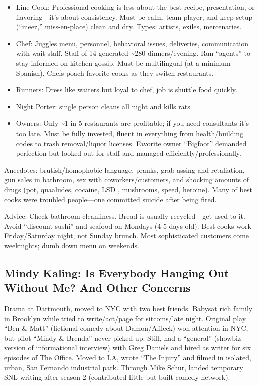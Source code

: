 \documentclass[
]{article}
\begin{document}
\begin{itemize}
\item
  Line Cook: Professional cooking is less about the best recipe,
  presentation, or flavoring---it's about consistency. Must be calm,
  team player, and keep setup (``meez,'' miss-en-place) clean and dry.
  Types: artists, exiles, mercenaries.
\item
  Chef: Juggles menu, personnel, behavioral issues, deliveries,
  communication with wait staff. Staff of 14 generated
  \textasciitilde280 dinners/evening. Run ``agents'' to stay informed on
  kitchen gossip. Must be multilingual (at a minimum Spanish). Chefs
  poach favorite cooks as they switch restaurants.
\item
  Runners: Dress like waiters but loyal to chef, job is shuttle food
  quickly.
\item
  Night Porter: single person cleans all night and kills rats.
\item
  Owners: Only \textasciitilde1 in 5 restaurants are profitable; if you
  need consultants it's too late. Must be fully invested, fluent in
  everything from health/building codes to trash removal/liquor
  licenses. Favorite owner ``Bigfoot'' demanded perfection but looked
  out for staff and managed efficiently/professionally.
\end{itemize}

Anecdotes: brutish/homophobic language, pranks, grab-assing and
retaliation, gun sales in bathroom, sex with coworkers/customers, and
shocking amounts of drugs (pot, quaaludes, cocaine, LSD , mushrooms,
speed, heroine). Many of best cooks were troubled people---one committed
suicide after being fired.

Advice: Check bathroom cleanliness. Bread is usually recycled---get used
to it. Avoid ``discount sushi'' and seafood on Mondays (4-5 days old).
Best cooks work Friday/Saturday night, not Sunday brunch. Most
sophisticated customers come weeknights; dumb down menu on weekends.

\hypertarget{mindy-kaling-is-everybody-hanging-out-without-me-and-other-concerns}{%
\subsection{Mindy Kaling: Is Everybody Hanging Out Without Me? And Other
Concerns}\label{mindy-kaling-is-everybody-hanging-out-without-me-and-other-concerns}}

Drama at Dartmouth, moved to NYC with two best friends. Babysat rich
family in Brooklyn while tried to write/act/page for sitcoms/late night.
Original play ``Ben \& Matt'' (fictional comedy about Damon/Affleck) won
attention in NYC, but pilot ``Mindy \& Brenda'' never picked up. Still,
had a ``general'' (showbiz version of informational interview) with Greg
Daniels and hired as writer for six episodes of The Office. Moved to LA,
wrote ``The Injury'' and filmed in isolated, urban, San Fernando
industrial park. Through Mike Schur, landed temporary SNL writing after
season 2 (contributed little but built comedy network).
\end{document}
